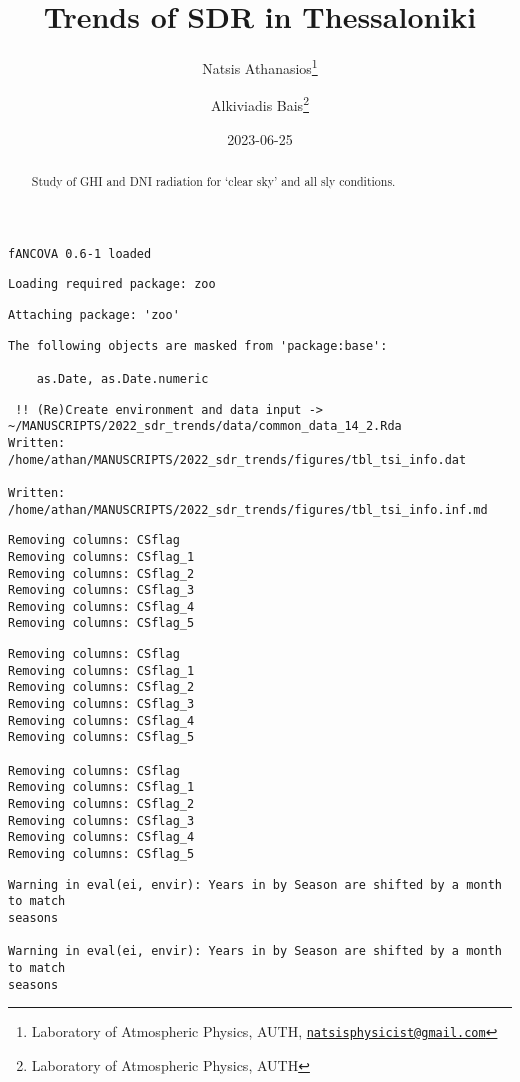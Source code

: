 \documentclass[
  10pt,
  a4paper,oneside]{article}
\title{Trends of SDR in Thessaloniki}
\author{Natsis Athanasios\footnote{Laboratory of Atmospheric Physics, AUTH, \href{mailto:natsisphysicist@gmail.com}{\nolinkurl{natsisphysicist@gmail.com}}} \and Alkiviadis Bais\footnote{Laboratory of Atmospheric Physics, AUTH}}
\date{2023-06-25}
\begin{document}
\maketitle
\begin{abstract}
Study of GHI and DNI radiation for `clear sky' and all sly conditions.
\end{abstract}

{
\hypersetup{linkcolor=}
\setcounter{tocdepth}{4}
\tableofcontents
}
\begin{verbatim}
fANCOVA 0.6-1 loaded
\end{verbatim}

\begin{verbatim}
Loading required package: zoo
\end{verbatim}

\begin{verbatim}
Attaching package: 'zoo'
\end{verbatim}

\begin{verbatim}
The following objects are masked from 'package:base':

    as.Date, as.Date.numeric
\end{verbatim}

\begin{verbatim}
 !! (Re)Create environment and data input -> ~/MANUSCRIPTS/2022_sdr_trends/data/common_data_14_2.Rda 
Written:  /home/athan/MANUSCRIPTS/2022_sdr_trends/figures/tbl_tsi_info.dat 

Written:  /home/athan/MANUSCRIPTS/2022_sdr_trends/figures/tbl_tsi_info.inf.md 
\end{verbatim}

\begin{verbatim}
Removing columns: CSflag
Removing columns: CSflag_1
Removing columns: CSflag_2
Removing columns: CSflag_3
Removing columns: CSflag_4
Removing columns: CSflag_5
\end{verbatim}

\begin{verbatim}
Removing columns: CSflag
Removing columns: CSflag_1
Removing columns: CSflag_2
Removing columns: CSflag_3
Removing columns: CSflag_4
Removing columns: CSflag_5

Removing columns: CSflag
Removing columns: CSflag_1
Removing columns: CSflag_2
Removing columns: CSflag_3
Removing columns: CSflag_4
Removing columns: CSflag_5
\end{verbatim}

\begin{verbatim}
Warning in eval(ei, envir): Years in by Season are shifted by a month to match
seasons

Warning in eval(ei, envir): Years in by Season are shifted by a month to match
seasons
\end{verbatim}
\end{document}
